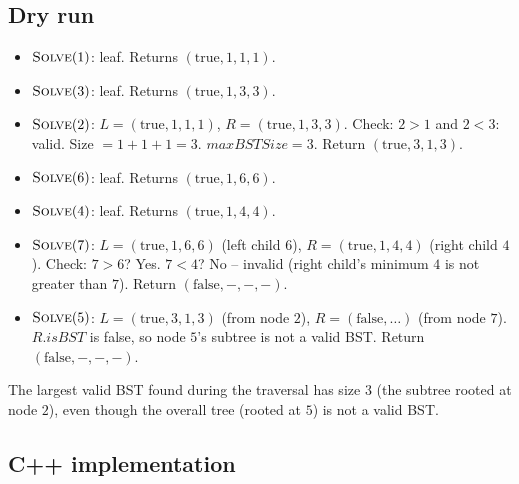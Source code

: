 \subsection*{Dry run}


\begin{itemize}
  \item $\textsc{Solve}(1)$: leaf. Returns $(\text{true},1,1,1)$.
  \item $\textsc{Solve}(3)$: leaf. Returns $(\text{true},1,3,3)$.
  \item $\textsc{Solve}(2)$: $L=(\text{true},1,1,1)$,
        $R=(\text{true},1,3,3)$. Check: $2>1$ and $2<3$: valid. Size
        $=1+1+1=3$. $\textit{maxBSTSize}=3$. Return
        $(\text{true},3,1,3)$.
  \item $\textsc{Solve}(6)$: leaf. Returns $(\text{true},1,6,6)$.
  \item $\textsc{Solve}(4)$: leaf. Returns $(\text{true},1,4,4)$.
  \item $\textsc{Solve}(7)$: $L=(\text{true},1,6,6)$ (left child $6$),
        $R=(\text{true},1,4,4)$ (right child $4$). Check: $7>6$? Yes.
        $7<4$? No -- invalid (right child's minimum $4$ is not greater
        than $7$). Return $(\text{false}, -, -, -)$.
  \item $\textsc{Solve}(5)$: $L=(\text{true},3,1,3)$ (from node $2$),
        $R=(\text{false}, \ldots)$ (from node $7$). $R.\textit{isBST}$
        is false, so node $5$'s subtree is not a valid BST. Return
        $(\text{false}, -, -, -)$.
\end{itemize}

The largest valid BST found during the traversal has size $3$ (the
subtree rooted at node $2$), even though the overall tree (rooted at $5$)
is not a valid BST.

\subsection*{C++ implementation}

